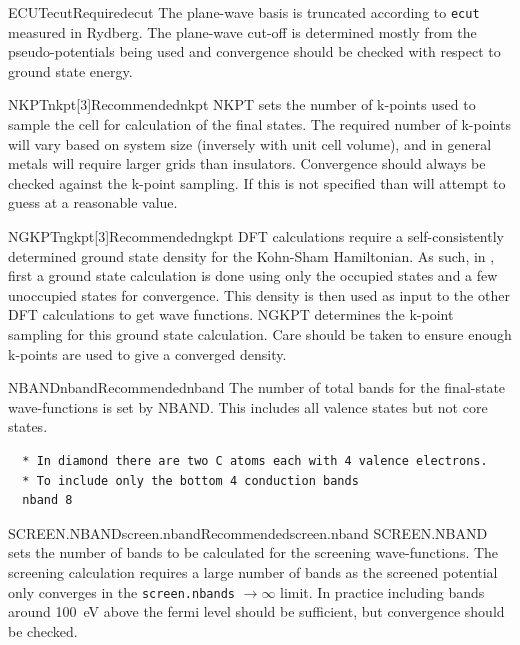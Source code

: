 \documentclass[11pt]{report}
\begin{document}
\begin{Card}{ECUT}{ecut}{Required}{ecut}
The plane-wave basis is truncated according to \texttt{ecut} measured in Rydberg. The plane-wave cut-off is determined mostly from the pseudo-potentials being used and convergence should be checked with respect to ground state energy.
\end{Card}

\begin{Card}{NKPT}{nkpt[3]}{Recommended}{nkpt}
NKPT sets the number of k-points used to sample the cell for calculation of the final states. The required number of k-points will vary based on system size (inversely with unit cell volume), and in general metals will require larger grids than insulators. Convergence should always be checked against the k-point sampling. If this is not specified than  will attempt to guess at a reasonable value. 
\end{Card}

\begin{Card}{NGKPT}{ngkpt[3]}{Recommended}{ngkpt}
DFT calculations require a self-consistently determined ground state density for the Kohn-Sham Hamiltonian. As such, in , first a ground state calculation is done using only the occupied states and a few unoccupied states for convergence. This density is then used as input to the other DFT calculations to get wave functions. NGKPT determines the k-point sampling for this ground state calculation. Care should be taken to ensure enough k-points are used to give a converged density.
\end{Card}

\begin{Card}{NBAND}{nband}{Recommended}{nband}
The number of total bands for the final-state wave-functions is set by NBAND. This includes all valence states but not core states.
\begin{verbatim}
  * In diamond there are two C atoms each with 4 valence electrons.
  * To include only the bottom 4 conduction bands
  nband 8
\end{verbatim}
\end{Card}

\begin{Card}{SCREEN.NBAND}{screen.nband}{Recommended}{screen.nband}
SCREEN.NBAND sets the number of bands to be calculated for the screening wave-functions. The screening calculation requires a large number of bands as the screened potential only converges in the \texttt{screen.nbands} $\rightarrow \infty$ limit. In practice including bands around 100~eV above the fermi level should be sufficient, but convergence should be checked. 
\end{Card}
\end{document}
